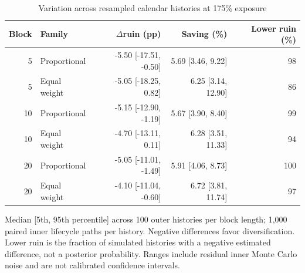 \begin{table}[htbp]\centering\small
\caption{Variation across resampled calendar histories at 175\% exposure}\label{tab:review-history}
\begin{tabular}{rlrrr}\toprule
Block & Family & $\Delta$ruin (pp) & Saving (\%) & Lower ruin (\%) \\
\midrule
5 & Proportional & -5.50 [-17.51, -0.50] & 5.69 [3.46, 9.22] & 98 \\
5 & Equal weight & -5.05 [-18.25, 0.82] & 6.25 [3.14, 12.90] & 86 \\
10 & Proportional & -5.15 [-12.90, -1.19] & 5.67 [3.90, 8.40] & 99 \\
10 & Equal weight & -4.70 [-13.11, 0.11] & 6.28 [3.51, 11.33] & 94 \\
20 & Proportional & -5.05 [-11.01, -1.49] & 5.91 [4.06, 8.73] & 100 \\
20 & Equal weight & -4.10 [-11.04, -0.60] & 6.72 [3.81, 11.74] & 97 \\
\bottomrule\end{tabular}
\par\smallskip\begin{minipage}{0.96\textwidth}\footnotesize
Median [5th, 95th percentile] across 100 outer histories per block length; 1,000 paired inner lifecycle paths per history. Negative differences favor diversification. Lower ruin is the fraction of simulated histories with a negative estimated difference, not a posterior probability. Ranges include residual inner Monte Carlo noise and are not calibrated confidence intervals.
\end{minipage}\end{table}

